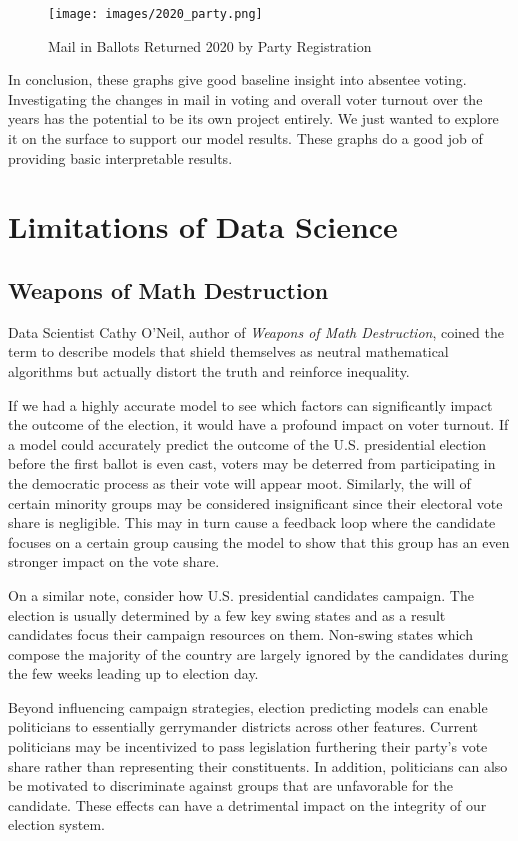 \documentclass[letterpaper, twocolumn]{article}
\begin{document}
\begin{figure}[h]
    \centering
    \texttt{[image: images/2020\_party.png]}
    \caption{Mail in Ballots Returned 2020 by Party Registration}
    \label{fig:arstmade}
\end{figure}

In conclusion, these graphs give good baseline insight into absentee voting. Investigating the changes in mail in voting and overall voter turnout over the years has the potential to be its own project entirely. We just wanted to explore it on the surface to support our model results. These graphs do a good job of providing basic interpretable results.


\section{Limitations of Data Science}

\subsection{Weapons of Math Destruction}

Data Scientist Cathy O'Neil, author of \emph{Weapons of Math Destruction}, coined the term to describe models that shield themselves as neutral mathematical algorithms but actually distort the truth and reinforce inequality.

If we had a highly accurate model to see which factors can significantly impact the outcome of the election, it would have a profound impact on voter turnout. If a model could accurately predict the outcome of the U.S. presidential election before the first ballot is even cast, voters may be deterred from participating in the democratic process as their vote will appear moot. Similarly, the will of certain minority groups may be considered insignificant since their electoral vote share is negligible. This may in turn cause a feedback loop where the candidate focuses on a certain group causing the model to show that this group has an even stronger impact on the vote share. 

On a similar note, consider how U.S. presidential candidates campaign. The election is usually determined by a few key swing states and as a result candidates focus their campaign resources on them. Non-swing states which compose the majority of the country are largely ignored by the candidates during the few weeks leading up to election day. 

Beyond influencing campaign strategies, election predicting models can enable politicians to essentially gerrymander districts across other features. Current politicians may be incentivized to pass legislation furthering their party's vote share rather than representing their constituents. In addition, politicians can also be motivated to discriminate against groups that are unfavorable for the candidate. These effects can have a detrimental impact on the integrity of our election system.
\end{document}
